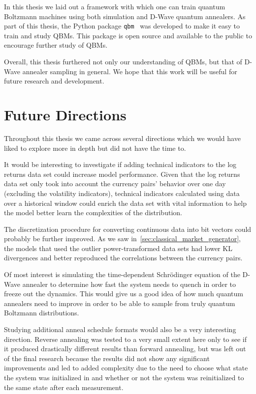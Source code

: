 In this thesis we laid out a framework with which one can train quantum Boltzmann machines using both simulation and D-Wave quantum annealers.
As part of this thesis, the Python package \texttt{qbm}~\cite{qbm} was developed to make it easy to train and study QBMs.
This package is open source and available to the public to encourage further study of QBMs.

Overall, this thesis furthered not only our understanding of QBMs, but that of D-Wave annealer sampling in general.
We hope that this work will be useful for future research and development.


\section{Future Directions}
Throughout this thesis we came across several directions which we would have liked to explore more in depth but did not have the time to.

It would be interesting to investigate if adding technical indicators to the log returns data set could increase model performance.
Given that the log returns data set only took into account the currency pairs' behavior over one day (excluding the volatility indicators), technical indicators calculated using data over a historical window could enrich the data set with vital information to help the model better learn the complexities of the distribution.

The discretization procedure for converting continuous data into bit vectors could probably be further improved.
As we saw in~\cref{sec:classical_market_generator}, the models that used the outlier power-transformed data sets had lower KL divergences and better reproduced the correlations between the currency pairs.

Of most interest is simulating the time-dependent Schr\"odinger equation of the D-Wave annealer to determine how fast the system needs to quench in order to freeze out the dynamics.
This would give us a good idea of how much quantum annealers need to improve in order to be able to sample from truly quantum Boltzmann distributions.

Studying additional anneal schedule formats would also be a very interesting direction.
Reverse annealing was tested to a very small extent here only to see if it produced drastically different results than forward annealing, but was left out of the final research because the results did not show any significant improvements and led to added complexity due to the need to choose what state the system was initialized in and whether or not the system was reinitialized to the same state after each measurement.
